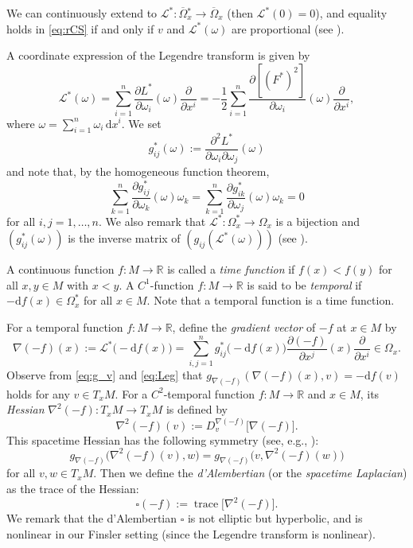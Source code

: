 \documentclass[a4paper,11pt]{article}
\numberwithin{equation}{section}
\theoremstyle{definition}
\theoremstyle{plain}
\newcommand{\del}{\partial}
\newcommand{\lra}{\longrightarrow}
\newcommand{\dd}{\mathrm{d}}
\newcommand{\R}{\ensuremath{\mathbb{R}}}
\newcommand{\LL}{\ensuremath{\mathscr{L}}}
\def\trace{\mathop{\mathrm{trace}}\nolimits}
\newcommand{\ol}[1]{\overline{#1}}
\begin{document}
We can continuously extend to $\LL^* \colon \ol{\Omega}{}^*_x \lra \ol{\Omega}_x$ (then $\LL^*(0)=0$), and equality holds in \eqref{eq:rCS} if and only if $v$ and $\LL^*(\omega)$ are proportional (see \cite[Theorem~3]{Min-cone}).

A coordinate expression of the Legendre transform is given by
\begin{equation}\label{eq:Leg}
\LL^*(\omega)
 =\sum_{i=1}^n \frac{\del L^*}{\del \omega_i}(\omega) \frac{\del}{\del x^i}
 =-\frac{1}{2} \sum_{i=1}^n \frac{\del[(F^*)^2]}{\del \omega_i}(\omega) \frac{\del}{\del x^i},
\end{equation}
where $\omega =\sum_{i=1}^n \omega_i \,\dd x^i$.
We set
\[ g^*_{ij}(\omega) :=\frac{\del^2 L^*}{\del \omega_i \del \omega_j}(\omega) \]
and note that, by the homogeneous function theorem,
\begin{equation}\label{eq:Euler}
\sum_{k=1}^n \frac{\del g^*_{ij}}{\del \omega_k}(\omega) \omega_k
=\sum_{k=1}^n \frac{\del g^*_{ik}}{\del \omega_j}(\omega) \omega_k
=0
\end{equation}
for all $i,j=1,\ldots,n$.
We also remark that $\LL^*\colon \Omega^*_x \lra \Omega_x$ is a bijection and $(g^*_{ij}(\omega))$ is the inverse matrix of $(g_{ij}(\LL^*(\omega)))$ (see \cite[Corollary~4]{Min-cone}).

A continuous function $f\colon M \lra \R$ is called a \emph{time function}
if $f(x)<f(y)$ for all $x,y \in M$ with $x<y$.
A $C^1$-function $f\colon M \lra \R$ is said to be \emph{temporal} if $-\dd f(x) \in \Omega^*_x$ for all $x \in M$.
Note that a temporal function is a time function.

For a temporal function $f\colon M \lra \R$,
define the \emph{gradient vector} of $-f$ at $x \in M$ by
\begin{equation}\label{eq:grad}
\nabla(-f)(x) :=\LL^* \bigl( -\dd f(x) \bigr)
 =\sum_{i,j=1}^n g^*_{ij}\bigl( -\dd f(x) \bigr)
 \frac{\del(-f)}{\del x^j}(x) \frac{\del}{\del x^i} \in \Omega_x.
\end{equation}
Observe from \eqref{eq:g_v} and \eqref{eq:Leg} that
$g_{\nabla(-f)}(\nabla(-f)(x),v) =-\dd f(v)$ holds for any $v \in T_xM$.
For a $C^2$-temporal function $f\colon M \lra \R$ and $x \in M$, its \emph{Hessian} $\nabla^2 (-f)\colon T_xM \lra T_xM$ is defined by
\begin{equation*}
\nabla^2 (-f)(v) :=D^{\nabla(-f)}_v \bigl[ \nabla(-f) \bigr].
\end{equation*}
This spacetime Hessian has the following symmetry (see, e.g., \cite[Lemma~4.12]{LMO2}):
\begin{equation}\label{eq:symm}
g_{\nabla(-f)}\bigl( \nabla^2 (-f)(v),w \bigr) =g_{\nabla(-f)} \bigl( v,\nabla^2 (-f)(w) \bigr)
\end{equation}
for all $v,w \in T_xM$.
Then we define the \emph{d'Alembertian} (or the \emph{spacetime Laplacian})
as the trace of the Hessian:
\begin{equation*}
\square(-f) :=\trace \bigl[ \nabla^2 (-f) \bigr].
\end{equation*}
We remark that the d'Alembertian $\square$ is not elliptic but hyperbolic,
and is nonlinear in our Finsler setting (since the Legendre transform is nonlinear).
\end{document}
